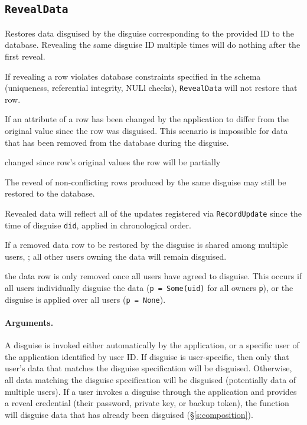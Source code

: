 \subsection{\texttt{RevealData}}

    Restores data disguised by the disguise corresponding to the provided ID to
    the database.
    Revealing the same disguise ID multiple times will do nothing after the
    first reveal.

    If revealing a row violates database constraints specified in the schema
    (\eg uniqueness, referential integrity, NULl checks), \texttt{RevealData} will not
    restore that row.  

    If an attribute of a row has been changed by the application to differ from
    the original value since the row was disguised. This scenario is impossible for
    data that has been removed from the database during the disguise.

    changed since row's original values the
    row will be partially 

    The reveal of non-conflicting rows produced by the same
    disguise may still be restored to the database.

    Revealed data will reflect all of the updates registered via
    \texttt{RecordUpdate} since the time of disguise \texttt{did}, applied in
    chronological order.

    If a removed data row to be restored by the disguise is shared among
    multiple users, ; all other users owning the
    data will remain disguised.


    the data row is only removed once all users have agreed to disguise. This
    occurs if \one{} all users individually disguise the data (\texttt{p =
    Some(uid)} for all owners \texttt{p}), or \two{} the disguise is applied
    over all users (\texttt{p = None}).

    \paragraph{Arguments.} 
    A disguise is invoked either automatically by the application, or a specific
    user of the application identified by user ID. 
    If disguise is user-specific, then only that user's data that matches the
    disguise specification will be disguised.  Otherwise, all data matching the
    disguise specification will be disguised (potentially data of multiple
    users). 
    If a user invokes a disguise through the application and provides a reveal
    credential (their password, private key, or backup token), the function 
    will disguise data
    that has already been disguised (\S\ref{s:composition}).

